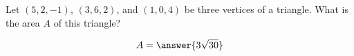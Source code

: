 \documentclass{ximera}
\author{Gregory Hartman \and Matthew Carr}
\begin{document}
\begin{exercise}
Let $(5,2,-1)$, $(3,6,2)$, and $(1,0,4)$ be three vertices of a triangle. What is the area $A$ of this triangle?
\begin{prompt}
\[
A=\answer{3\sqrt{30}}
\]
\end{prompt}


\end{exercise}
\end{document}
